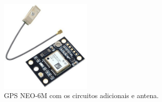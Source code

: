 



\begin{figure}[ht]
    \centering
    \caption{GPS NEO-6M com os circuitos adicionais e antena.}
    \begin{center}
        \includegraphics[width=0.40\textwidth]{img/NEO-6M GPS.png}
    \end{center}
    \vspace{-0.5cm}
    \label{fig:GPSNEO6M}
\end{figure}